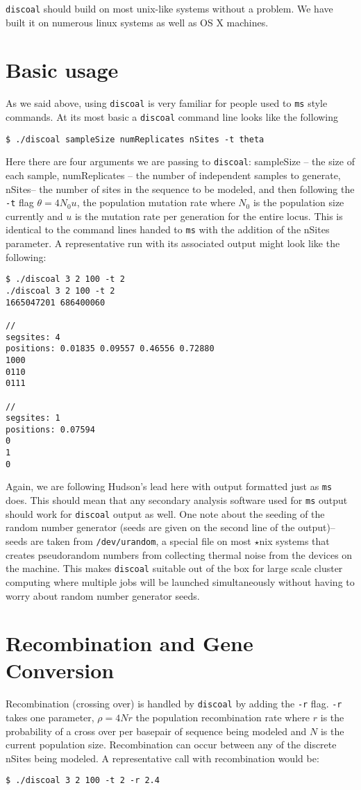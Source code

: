 \documentclass[12pt]{article}
\begin{document}
\texttt{discoal} should build on most unix-like systems without a problem. We have built it on numerous linux systems as
well as OS X machines.  

\section*{Basic usage}
As we said above, using \texttt{discoal} is very familiar for people used to \texttt{ms} style commands. At its
most basic a \texttt{discoal} command line looks like the following
\begin{verbatim}
$ ./discoal sampleSize numReplicates nSites -t theta
\end{verbatim}
Here there are four arguments we are passing to \texttt{discoal}: sampleSize -- the size of each sample, numReplicates -- the
number of independent samples to generate, nSites-- the number of sites in the sequence to be modeled, and then following the \texttt{-t}
flag $\theta = 4N_0u$, the population mutation rate where $N_0$ is the population size currently and $u$ is the mutation rate per generation for the entire locus. This is identical to 
the command lines handed to \texttt{ms} with the addition of the nSites parameter. A representative run with its associated output might look like the following:
\begin{verbatim}
$ ./discoal 3 2 100 -t 2
./discoal 3 2 100 -t 2
1665047201 686400060

//
segsites: 4
positions: 0.01835 0.09557 0.46556 0.72880
1000
0110
0111

//
segsites: 1
positions: 0.07594
0
1
0
\end{verbatim}
Again, we are following Hudson's lead here with output formatted just as \texttt{ms} does. This should mean that any secondary analysis software
used for \texttt{ms} output should work for \texttt{discoal} output as well. One note about the seeding of the random number generator (seeds are given
on the second line of the output)-- seeds are taken from \texttt{/dev/urandom}, a special file on most $\star$nix systems that creates pseudorandom numbers
from collecting thermal noise from the devices on the machine. This makes \texttt{discoal} suitable out of the box for large scale cluster computing 
where multiple jobs will be launched simultaneously without having to worry about random number generator seeds.

\section*{Recombination and Gene Conversion}
Recombination (crossing over) is handled by \texttt{discoal} by adding the \texttt{-r} flag. \texttt{-r} takes one parameter, $\rho=4Nr$ the population recombination rate where $r$ is the probability of a cross over per basepair of sequence being modeled and $N$ is the current population size. Recombination can occur between any of the discrete nSites being modeled. A representative call with recombination would be:
\begin{verbatim}
$ ./discoal 3 2 100 -t 2 -r 2.4
\end{verbatim}
\end{document}
